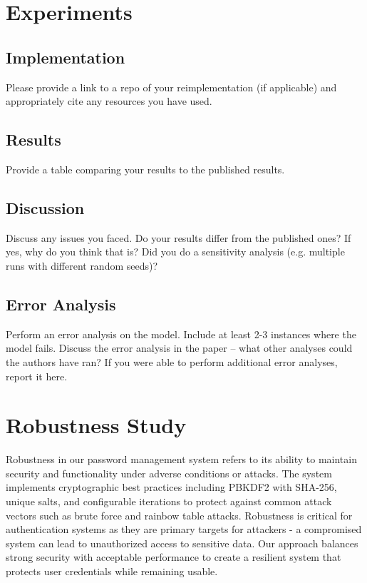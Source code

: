 \documentclass[11pt,a4paper]{article}
\begin{document}
\section{Experiments}

\subsection{Implementation} 
Please provide a link to a repo of your reimplementation (if applicable) and appropriately cite any resources you have used.

\subsection{Results}
Provide a table comparing your results to the published results.

\subsection{Discussion}
Discuss any issues you faced. Do your results differ from the published ones? If yes, why do you think that is? Did you do a sensitivity analysis (e.g. multiple runs with different random seeds)?


\subsection{Error Analysis}
Perform an error analysis on the model. Include at least 2-3 instances where the model fails. Discuss the error analysis in the paper -- what other analyses could the authors have ran? If you were able to perform additional error analyses, report it here.

\section{Robustness Study}

Robustness in our password management system refers to its ability to maintain security and functionality under adverse conditions or attacks. The system implements cryptographic best practices including PBKDF2 with SHA-256, unique salts, and configurable iterations to protect against common attack vectors such as brute force and rainbow table attacks. Robustness is critical for authentication systems as they are primary targets for attackers - a compromised system can lead to unauthorized access to sensitive data. Our approach balances strong security with acceptable performance to create a resilient system that protects user credentials while remaining usable.
\end{document}
